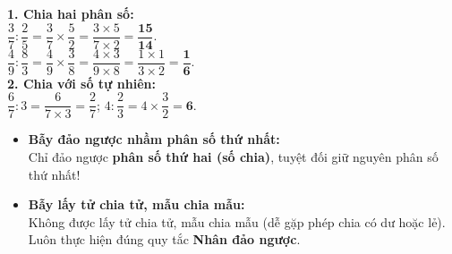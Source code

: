 \documentclass[14pt,a4paper,oneside]{extbook}
\begin{document}
\vspace{-2.5mm}
\noindent
\begin{minipage}[t]{0.49\textwidth}\vspace{0pt}
\begin{tcolorbox}[
  enhanced,
  colback=green!4!white,
  colframe=green!60!black,
  arc=2mm, boxrule=0.8pt,
  left=2mm, right=2mm, top=1.8mm, bottom=1.8mm,
  title={\footnotesize\bfseries\color{white}\faCheckCircle\ Ví dụ thực hành chuẩn mực}
]
{\footnotesize
\textbf{1. Chia hai phân số:}\\
$\dfrac{3}{7} : \dfrac{2}{5} = \dfrac{3}{7} \times \dfrac{5}{2} = \dfrac{3 \times 5}{7 \times 2} = \mathbf{\dfrac{15}{14}}$.\\
$\dfrac{4}{9} : \dfrac{8}{3} = \dfrac{4}{9} \times \dfrac{3}{8} = \dfrac{4 \times 3}{9 \times 8} = \dfrac{1 \times 1}{3 \times 2} = \mathbf{\dfrac{1}{6}}$.\\
\textbf{2. Chia với số tự nhiên:}\\
$\dfrac{6}{7} : 3 = \dfrac{6}{7 \times 3} = \dfrac{2}{7}$; \quad $4 : \dfrac{2}{3} = 4 \times \dfrac{3}{2} = \mathbf{6}$.
}
\end{tcolorbox}
\end{minipage}
\hfill
\begin{minipage}[t]{0.49\textwidth}\vspace{0pt}
\begin{tcolorbox}[
  enhanced,
  colback=red!4!white,
  colframe=red!70!black,
  arc=2mm, boxrule=0.8pt,
  left=2mm, right=2mm, top=1.8mm, bottom=1.8mm,
  title={\footnotesize\bfseries\color{white}\faExclamationTriangle\ Mẹo tránh bẫy trắc nghiệm}
]
{\footnotesize
\begin{itemize}\setlength{\itemsep}{1.5pt}\setlength{\leftskip}{-2.5mm}
  \item \textbf{Bẫy đảo ngược nhầm phân số thứ nhất:}\\
  Chỉ đảo ngược \textbf{phân số thứ hai (số chia)}, tuyệt đối giữ nguyên phân số thứ nhất!
  \item \textbf{Bẫy lấy tử chia tử, mẫu chia mẫu:}\\
  Không được lấy tử chia tử, mẫu chia mẫu (dễ gặp phép chia có dư hoặc lẻ). Luôn thực hiện đúng quy tắc \textbf{Nhân đảo ngược}.
\end{itemize}
}
\end{tcolorbox}
\end{minipage}
\end{document}

